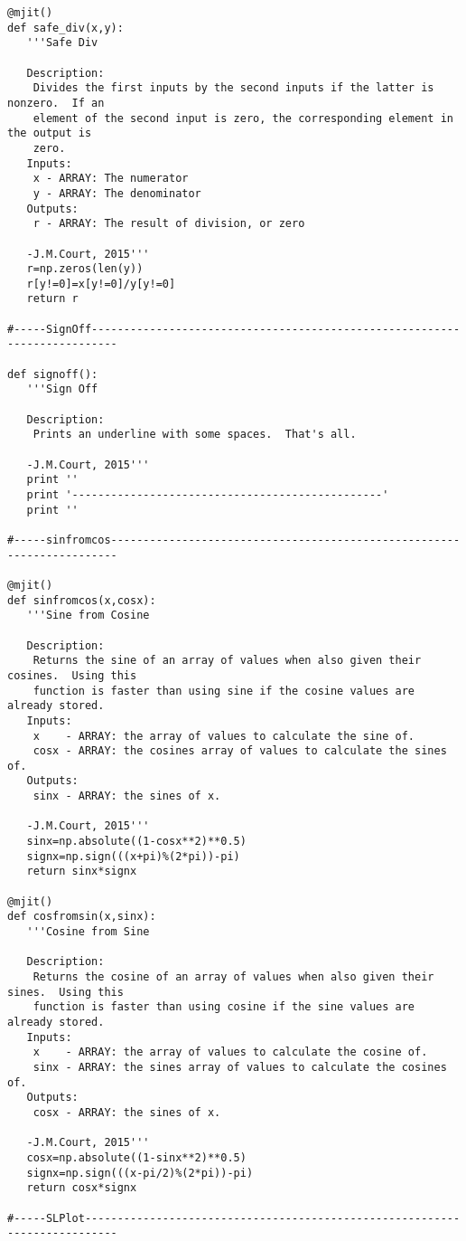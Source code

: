 \begin{verbatim}
@mjit()
def safe_div(x,y):
   '''Safe Div

   Description:
    Divides the first inputs by the second inputs if the latter is nonzero.  If an
    element of the second input is zero, the corresponding element in the output is
    zero.
   Inputs:
    x - ARRAY: The numerator
    y - ARRAY: The denominator
   Outputs:
    r - ARRAY: The result of division, or zero

   -J.M.Court, 2015'''
   r=np.zeros(len(y))
   r[y!=0]=x[y!=0]/y[y!=0]
   return r

#-----SignOff--------------------------------------------------------------------------

def signoff():
   '''Sign Off

   Description:
    Prints an underline with some spaces.  That's all.

   -J.M.Court, 2015'''
   print ''
   print '------------------------------------------------'
   print ''

#-----sinfromcos-----------------------------------------------------------------------

@mjit()
def sinfromcos(x,cosx):
   '''Sine from Cosine

   Description:
    Returns the sine of an array of values when also given their cosines.  Using this
    function is faster than using sine if the cosine values are already stored.
   Inputs:
    x    - ARRAY: the array of values to calculate the sine of.
    cosx - ARRAY: the cosines array of values to calculate the sines of.
   Outputs:
    sinx - ARRAY: the sines of x.

   -J.M.Court, 2015'''
   sinx=np.absolute((1-cosx**2)**0.5)
   signx=np.sign(((x+pi)%(2*pi))-pi)
   return sinx*signx

@mjit()
def cosfromsin(x,sinx):
   '''Cosine from Sine

   Description:
    Returns the cosine of an array of values when also given their sines.  Using this
    function is faster than using cosine if the sine values are already stored.
   Inputs:
    x    - ARRAY: the array of values to calculate the cosine of.
    sinx - ARRAY: the sines array of values to calculate the cosines of.
   Outputs:
    cosx - ARRAY: the sines of x.

   -J.M.Court, 2015'''
   cosx=np.absolute((1-sinx**2)**0.5)
   signx=np.sign(((x-pi/2)%(2*pi))-pi)
   return cosx*signx

#-----SLPlot---------------------------------------------------------------------------


\end{verbatim}
